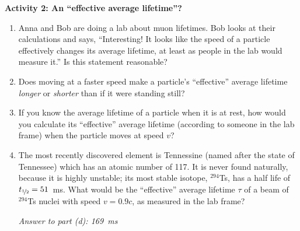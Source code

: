 \textbf{Activity 2: An ``effective average lifetime''?}
\begin{enumerate}[labparts]
\item  
Anna and Bob are doing a lab about muon lifetimes.  Bob looks at their calculations and says, ``Interesting! It looks like the speed of a particle effectively changes its average lifetime, at least as people in the lab would measure it.''  Is this statement reasonable?
\answerspace{0.6in}

\item Does moving at a faster speed make a particle's ``effective'' average lifetime \textit{longer} or \textit{shorter} than if it were standing still?
\answerspace{0.6in}

\item If you know the average lifetime of a particle when it is at rest, how would you calculate its ``effective'' average lifetime (according to someone in the lab frame) when the particle moves at speed $v$?
\answerspace{0.9in}

\item The most recently discovered element is Tennessine (named after the state of Tennessee) which has an atomic number of 117.  It is never found naturally, because it is highly unstable; its most stable isotope, $^{294}$Ts, has a half life of $t_{\rm \nicefrac{1\mkern-1mu}{\mkern-1mu2}} = 51$~ms.  What would be the ``effective'' average lifetime $\tau$ of a beam of $^{294}$Ts nuclei with speed $v=0.9c$, as measured in the lab frame?
\answerspace{0.9in}
\vspace{\fill}

\hspace{\fill}\textit{Answer to part (d): 169~ms}
\end{enumerate}


